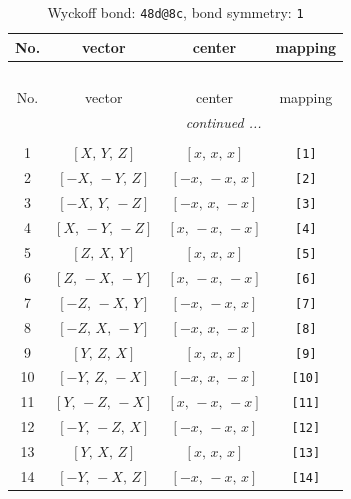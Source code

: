 \documentclass[fleqn,8pt]{jsarticle}
\begin{document}
\begin{longtable}{cccc}
\caption{Wyckoff bond: {\tt 48d@8c}, bond symmetry: {\tt 1}}
 \\
 \hline \hline
No. & vector & center & mapping \\ \hline \endfirsthead

\multicolumn{3}{l}{\tablename\ \thetable{}} \\
 \hline \hline
No. & vector & center & mapping \\ \hline \endhead

 \hline \hline
\multicolumn{3}{r}{\footnotesize\it continued ...} \\ \endfoot

 \hline \hline
\multicolumn{3}{r}{} \\ \endlastfoot

1 & $\left[ X,\, Y,\, Z \right]$ & $\left[ x,\, x,\, x \right]$ & {\tt [1]} \\ \hline
2 & $\left[ - X,\, - Y,\, Z \right]$ & $\left[ - x,\, - x,\, x \right]$ & {\tt [2]} \\ \hline
3 & $\left[ - X,\, Y,\, - Z \right]$ & $\left[ - x,\, x,\, - x \right]$ & {\tt [3]} \\ \hline
4 & $\left[ X,\, - Y,\, - Z \right]$ & $\left[ x,\, - x,\, - x \right]$ & {\tt [4]} \\ \hline
5 & $\left[ Z,\, X,\, Y \right]$ & $\left[ x,\, x,\, x \right]$ & {\tt [5]} \\ \hline
6 & $\left[ Z,\, - X,\, - Y \right]$ & $\left[ x,\, - x,\, - x \right]$ & {\tt [6]} \\ \hline
7 & $\left[ - Z,\, - X,\, Y \right]$ & $\left[ - x,\, - x,\, x \right]$ & {\tt [7]} \\ \hline
8 & $\left[ - Z,\, X,\, - Y \right]$ & $\left[ - x,\, x,\, - x \right]$ & {\tt [8]} \\ \hline
9 & $\left[ Y,\, Z,\, X \right]$ & $\left[ x,\, x,\, x \right]$ & {\tt [9]} \\ \hline
10 & $\left[ - Y,\, Z,\, - X \right]$ & $\left[ - x,\, x,\, - x \right]$ & {\tt [10]} \\ \hline
11 & $\left[ Y,\, - Z,\, - X \right]$ & $\left[ x,\, - x,\, - x \right]$ & {\tt [11]} \\ \hline
12 & $\left[ - Y,\, - Z,\, X \right]$ & $\left[ - x,\, - x,\, x \right]$ & {\tt [12]} \\ \hline
13 & $\left[ Y,\, X,\, Z \right]$ & $\left[ x,\, x,\, x \right]$ & {\tt [13]} \\ \hline
14 & $\left[ - Y,\, - X,\, Z \right]$ & $\left[ - x,\, - x,\, x \right]$ & {\tt [14]} \\ \hline

\end{longtable}
\end{document}
